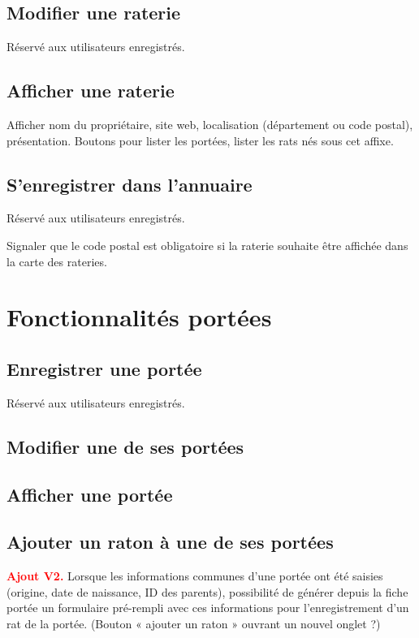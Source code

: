 \documentclass[a4paper,10pt]{article}
\newcommand\desire[1]{\noindent\textbf{\textcolor{red}{#1}}}
\begin{document}
\subsection{Modifier une raterie}
Réservé aux utilisateurs enregistrés.

\subsection{Afficher une raterie}
Afficher nom du propriétaire, site web, localisation (département ou code postal), présentation. Boutons pour lister les portées, lister les rats nés sous cet affixe.
\subsection{S'enregistrer dans l'annuaire}
Réservé aux utilisateurs enregistrés.

Signaler que le code postal est obligatoire si la raterie souhaite être affichée dans la carte des rateries.

\section{Fonctionnalités portées}

\subsection{Enregistrer une portée}
Réservé aux utilisateurs enregistrés.

\subsection{Modifier une de ses portées} 

\subsection{Afficher une portée} 

\subsection{Ajouter un raton à une de ses portées}
 
\desire{Ajout V2.} Lorsque les informations communes d'une portée ont été saisies (origine, date de naissance, ID des parents), possibilité de générer depuis la fiche portée un formulaire pré-rempli avec ces informations pour l'enregistrement d'un rat de la portée. (Bouton « ajouter un raton » ouvrant un nouvel onglet ?)  
\end{document}
